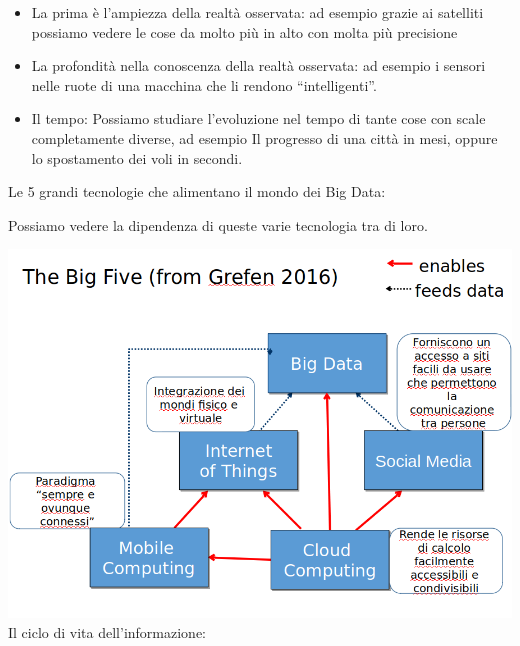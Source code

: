 \documentclass[]{article}
\begin{document}
\begin{itemize}
	 
	\item
	La prima è l'ampiezza della realtà osservata: ad esempio grazie ai
	satelliti possiamo vedere le cose da molto più in alto con molta più
	precisione
	\item
	La profondità nella conoscenza della realtà osservata: ad esempio i
	sensori nelle ruote di una macchina che li rendono ``intelligenti''.
	\item
	Il tempo: Possiamo studiare l'evoluzione nel tempo di tante cose con
	scale completamente diverse, ad esempio Il progresso di una città in
	mesi, oppure lo spostamento dei voli in secondi.
\end{itemize}

Le 5 grandi tecnologie che alimentano il mondo dei Big Data:

Possiamo vedere la dipendenza di queste varie tecnologia tra di loro.

\includegraphics[scale=0.4]{image7.png}
Il ciclo di vita dell'informazione:
\end{document}
